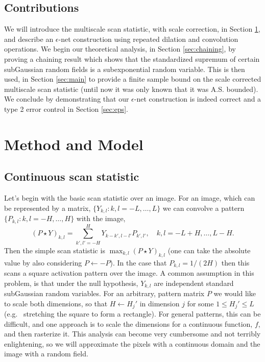 \subsection{Contributions}

We will introduce the multiscale scan statistic, with scale correction, in Section \ref{sec:method}, and describe an $\epsilon$-net construction using repeated dilation and convolution operations.
We begin our theoretical analysis, in Section \ref{sec:chaining}, by proving a chaining result which shows that the standardized supremum of certain subGaussian random fields is a subexponential random variable.
This is then used, in Section \ref{sec:main} to provide a finite sample bound on the scale corrected multiscale scan statistic (until now it was only known that it was A.S. bounded).
We conclude by demonstrating that our $\epsilon$-net construction is indeed correct and a type 2 error control in Section \ref{sec:eps}.

\section{Method and Model}
\label{sec:method}

\subsection{Continuous scan statistic}

Let's begin with the basic scan statistic over an image.
For an image, which can be represented by a matrix, $\{Y_{k,l} :k,l=-L,\ldots,L\}$ we can convolve a pattern $\{P_{k,l}:k,l=-H,\ldots,H\}$ with the image,
$$
(P \star Y)_{k,l} = \sum_{k',l' = -H}^{H} Y_{k - k',l - l'} P_{k', l'}, \quad k,l = -L + H, \ldots, L-H.
$$
Then the simple scan statistic is $\max_{k,l} (P \star Y)_{k,l}$ (one can take the absolute value by also considering $P \gets -P$).
In the case that $P_{k,l} = 1/(2H)$ then this scans a square activation pattern over the image.
A common assumption in this problem, is that under the null hypothesis, $Y_{k,l}$ are independent standard subGaussian random variables.
For an arbitrary, pattern matrix $P$ we would like to scale both dimensions, so that $H \gets H_j'$ in dimension $j$ for some $1 \le H_j' \le L$ (e.g.~ stretching the square to form a rectangle).
For general patterns, this can be difficult, and one approach is to scale the dimensions for a continuous function, $f$, and then rasterize it.
This analysis can become very cumbersome and not terribly enlightening, so we will approximate the pixels with a continuous domain and the image with a random field.

